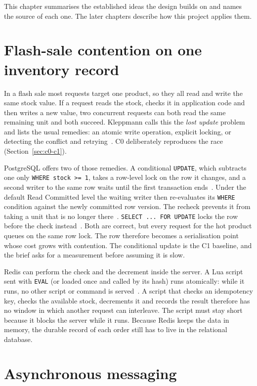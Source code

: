 \documentclass[a4paper]{report}
\begin{document}
This chapter summarises the established ideas the design builds on and names
the source of each one. The later chapters describe how this project applies
them.

\section{Flash-sale contention on one inventory record}
\label{sec:bg-contention}

In a flash sale most requests target one product, so they all read and write
the same stock value. If a request reads the stock, checks it in application
code and then writes a new value, two concurrent requests can both read the
same remaining unit and both succeed. Kleppmann calls this the \emph{lost
update} problem and lists the usual remedies: an atomic write operation,
explicit locking, or detecting the conflict and retrying~\cite{kleppmann-ddia}.
C0 deliberately reproduces the race (Section~\ref{sec:c0-c1}).

PostgreSQL offers two of those remedies. A conditional \texttt{UPDATE}, which
subtracts one only \texttt{WHERE stock >= 1}, takes a row-level lock on the
row it changes, and a second writer to the same row waits until the first
transaction ends~\cite{pg-locking}. Under the default Read Committed level the
waiting writer then re-evaluates its \texttt{WHERE} condition against the
newly committed row version. The recheck prevents it from taking a unit that
is no longer there~\cite{pg-isolation}. \texttt{SELECT ... FOR UPDATE} locks
the row before the check instead~\cite{pg-select}. Both are correct, but
every request for the hot product queues on the same row lock. The row
therefore becomes a serialisation point whose cost grows with contention.
The conditional update is the C1 baseline, and the brief asks for a
measurement before assuming it is slow.

Redis can perform the check and the decrement inside the server. A Lua script
sent with \texttt{EVAL} (or loaded once and called by its hash) runs
atomically: while it runs, no other script or command is
served~\cite{redis-lua,redis-eval}. A script that checks an idempotency key,
checks the available stock, decrements it and records the result therefore
has no window in which another request can interleave. The script must stay
short because it blocks the server while it runs. Because Redis keeps the data
in memory, the durable record of each order still has to live in the
relational database.

\section{Asynchronous messaging}
\label{sec:bg-messaging}
\end{document}
